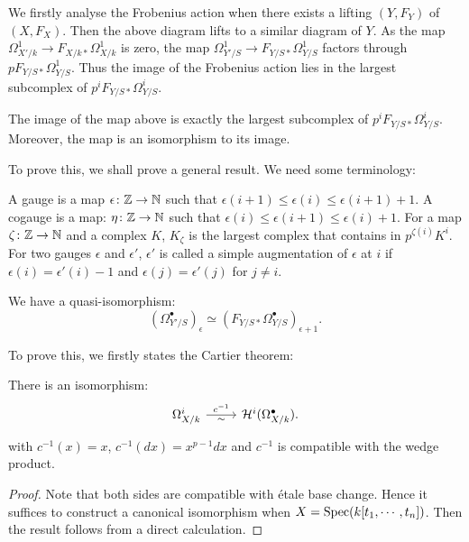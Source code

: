 We firstly analyse the Frobenius action when there exists a lifting $(Y,F_Y)$ of $(X,F_X)$. 
Then the above diagram lifts to a similar diagram of $Y$. 
As the map $\Omega_{X'/k}^1 \to F_{X/k*} \Omega_{X/k}^1$ is zero, 
the map $\Omega_{Y'/S}^1 \to F_{Y/S*} \Omega_{Y/S}^1$ 
factors through $p F_{Y/S*} \Omega_{Y/S}^1$. 
Thus the image of the Frobenius action 
lies in the largest subcomplex of $p^iF_{Y/S*} \Omega_{Y/S}^i$. 

\begin{proposition}
    The image of the map above is exactly 
    the largest subcomplex of $p^i F_{Y/S*} \Omega_{Y/S}^i$. 
    Moreover, the map is an isomorphism to its image.
\end{proposition}

To prove this, we shall prove a general result. 
We need some terminology:
\begin{definition}
    A gauge is a map $\epsilon \colon {\mathbb {Z}} \to {\mathbb {N}}$ 
    such that $\epsilon(i + 1) \leq \epsilon(i) \leq \epsilon(i + 1) + 1$. 
    A cogauge is a map: $\eta \colon {\mathbb {Z}} \to {\mathbb {N}}$ 
    such that $\epsilon(i) \leq \epsilon(i + 1) \leq \epsilon(i) + 1$. 
    For a map $\zeta \colon {\mathbb {Z}} \to {\mathbb {N}}$ and a complex $K$, 
    $K_\zeta$ is the largest complex that contains in $p^{\zeta(i)} K^i$. 
    For two gauges $\epsilon$ and $\epsilon'$, 
    $\epsilon'$ is called a simple augmentation of $\epsilon$ at $i$ 
    if $\epsilon(i) = \epsilon'(i) - 1$ and $\epsilon(j) = \epsilon'(j)$ for $j \neq i$. 
\end{definition}

\begin{proposition}
    We have a quasi-isomorphism:
    \[
        (\Omega_{Y'/S}^\bullet)_\epsilon 
        \simeq (F_{Y/S*} \Omega_{Y/S}^\bullet)_{\epsilon + 1}.
    \]
\end{proposition}

To prove this, we firstly states the Cartier theorem:
\begin{proposition}
    There is an isomorphism:
    \[
        \begin{tikzcd}
            \Omega_{X/k}^i \ar[r, "{\sim}"swap, "{c^{-1}}"] 
            & \CH^i (\Omega_{X/k}^\bullet).
        \end{tikzcd}
    \]
    with $c^{-1}(x) = x$, $c^{-1}(dx) = x^{p-1} dx$ 
    and $c^{-1}$ is compatible with the wedge product.
\end{proposition}

\begin{proof}
    Note that both sides are compatible with \'etale base change.
    Hence it suffices to construct a canonical isomorphism when 
    $X = \operatorname{Spec} (k[t_1, \cdots, t_n])$. 
    Then the result follows from a direct calculation.
\end{proof}

